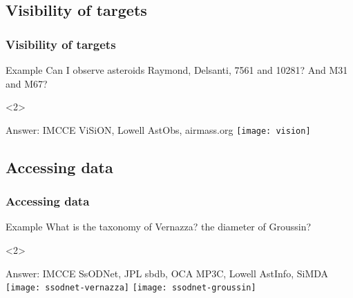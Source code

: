 \subsection{Visibility of targets}
\begin{frame}
  \frametitle{Visibility of targets}

  \begin{overlayarea}{\textwidth}{0.15\textheight}
    \vspace{-0.5em}
    \begin{exampleblock}{Example}
      Can I observe asteroids Raymond, Delsanti, 7561 and 10281? And M31 and M67?
    \end{exampleblock}
  \end{overlayarea}

  \begin{overlayarea}{\textwidth}{0.8\textheight}
    \begin{onlyenv}<2>
      \begin{block}{Answer: IMCCE ViSiON, Lowell AstObs, airmass.org}
        \hspace{.25\textwidth}\texttt{[image: vision]}
      \end{block}
    \end{onlyenv}
  \end{overlayarea}
\end{frame}

\subsection{Accessing data}
\begin{frame}
  \frametitle{Accessing data}

  \begin{overlayarea}{\textwidth}{0.15\textheight}
    \vspace{-0.5em}
    \begin{exampleblock}{Example}
      What is the taxonomy of Vernazza? the diameter of Groussin?
    \end{exampleblock}
  \end{overlayarea}

  \begin{overlayarea}{\textwidth}{0.8\textheight}
    \begin{onlyenv}<2>
      \begin{block}{Answer: IMCCE SsODNet, JPL sbdb, OCA MP3C, Lowell AstInfo, SiMDA}
        \hspace{.05\hsize}\texttt{[image: ssodnet-vernazza]}
        \texttt{[image: ssodnet-groussin]}
      \end{block}
    \end{onlyenv}
  \end{overlayarea}

\end{frame}
